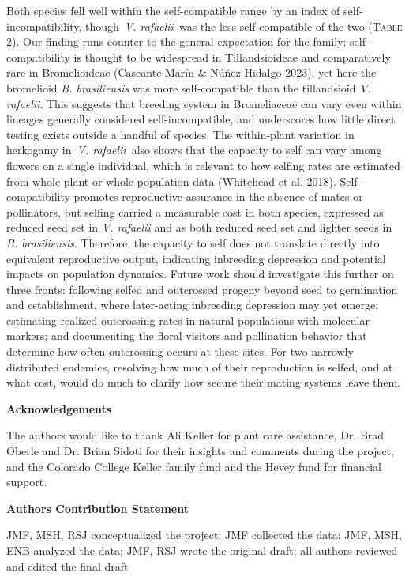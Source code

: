 \documentclass[
]{article}
\begin{document}
Both species fell well within the self-compatible range by an index of
self-incompatibility, though~\emph{V. rafaelii}~was the less
self-compatible of the two (\textsc{Table 2}). Our finding runs counter
to the general expectation for the family: self-compatibility is thought
to be widespread in Tillandsioideae and comparatively rare in
Bromelioideae (Cascante-Marín \& Núñez-Hidalgo 2023), yet here the
bromelioid \emph{B. brasiliensis} was more self-compatible than the
tillandsioid \emph{V. rafaelii}. This suggests that breeding system in
Bromeliaceae can vary even within lineages generally considered
self-incompatible, and underscores how little direct testing exists
outside a handful of species. The within-plant variation in herkogamy
in~\emph{V. rafaelii}~also shows that the capacity to self can vary
among flowers on a single individual, which is relevant to how selfing
rates are estimated from whole-plant or whole-population data (Whitehead
et al. 2018). Self-compatibility promotes reproductive assurance in the
absence of mates or pollinators, but selfing carried a measurable cost
in both species, expressed as reduced seed set in \emph{V. rafaelii} and
as both reduced seed set and lighter seeds in \emph{B. brasiliensis}.
Therefore, the capacity to self does not translate directly into
equivalent reproductive output, indicating inbreeding depression and
potential impacts on population dynamics. Future work should investigate
this further on three fronts: following selfed and outcrossed progeny
beyond seed to germination and establishment, where later-acting
inbreeding depression may yet emerge; estimating realized outcrossing
rates in natural populations with molecular markers; and documenting the
floral visitors and pollination behavior that determine how often
outcrossing occurs at these sites. For two narrowly distributed
endemics, resolving how much of their reproduction is selfed, and at
what cost, would do much to clarify how secure their mating systems
leave them.

\textbf{Acknowledgements}

The authors would like to thank Ali Keller for plant care assistance,
Dr. Brad Oberle and Dr. Brian Sidoti for their insights and comments
during the project, and the Colorado College Keller family fund and the
Hevey fund for financial support.

\textbf{Authors Contribution Statement}

JMF, MSH, RSJ conceptualized the project; JMF collected the data; JMF,
MSH, ENB analyzed the data; JMF, RSJ wrote the original draft; all
authors reviewed and edited the final draft
\end{document}
